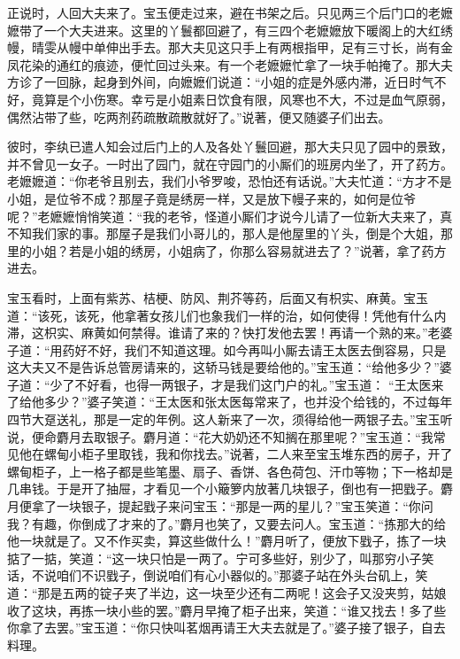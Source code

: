 \begin{parag}
    正说时，人回大夫来了。宝玉便走过来，避在书架之后。只见两三个后门口的老嬷嬷带了一个大夫进来。这里的丫鬟都回避了，有三四个老嬷嬷放下暖阁上的大红绣幔，晴雯从幔中单伸出手去。那大夫见这只手上有两根指甲，足有三寸长，尚有金凤花染的通红的痕迹，便忙回过头来。有一个老嬷嬷忙拿了一块手帕掩了。那大夫方诊了一回脉，起身到外间，向嬷嬷们说道：“小姐的症是外感内滞，近日时气不好，竟算是个小伤寒。幸亏是小姐素日饮食有限，风寒也不大，不过是血气原弱，偶然沾带了些，吃两剂药疏散疏散就好了。”说著，便又随婆子们出去。
\end{parag}


\begin{parag}
    彼时，李纨已遣人知会过后门上的人及各处丫鬟回避，那大夫只见了园中的景致，并不曾见一女子。一时出了园门，就在守园门的小厮们的班房内坐了，开了药方。老嬷嬷道：“你老爷且别去，我们小爷罗唆，恐怕还有话说。”大夫忙道：“方才不是小姐，是位爷不成？那屋子竟是绣房一样，又是放下幔子来的，如何是位爷呢？”老嬷嬷悄悄笑道：“我的老爷，怪道小厮们才说今儿请了一位新大夫来了，真不知我们家的事。那屋子是我们小哥儿的，那人是他屋里的丫头，倒是个大姐，那里的小姐？若是小姐的绣房，小姐病了，你那么容易就进去了？”说著，拿了药方进去。
\end{parag}


\begin{parag}
    宝玉看时，上面有紫苏、桔梗、防风、荆芥等药，后面又有枳实、麻黄。宝玉道：“该死，该死，他拿著女孩儿们也象我们一样的治，如何使得！凭他有什么内滞，这枳实、麻黄如何禁得。谁请了来的？快打发他去罢！再请一个熟的来。”老婆子道：“用药好不好，我们不知道这理。如今再叫小厮去请王太医去倒容易，只是这大夫又不是告诉总管房请来的，这轿马钱是要给他的。”宝玉道：“给他多少？”婆子道：“少了不好看，也得一两银子，才是我们这门户的礼。”宝玉道： “王太医来了给他多少？”婆子笑道：“王太医和张太医每常来了，也并没个给钱的，不过每年四节大趸送礼，那是一定的年例。这人新来了一次，须得给他一两银子去。”宝玉听说，便命麝月去取银子。麝月道：“花大奶奶还不知搁在那里呢？”宝玉道：“我常见他在螺甸小柜子里取钱，我和你找去。”说著，二人来至宝玉堆东西的房子，开了螺甸柜子，上一格子都是些笔墨、扇子、香饼、各色荷包、汗巾等物；下一格却是几串钱。于是开了抽屉，才看见一个小簸箩内放著几块银子，倒也有一把戥子。麝月便拿了一块银子，提起戥子来问宝玉：“那是一两的星儿？”宝玉笑道：“你问我？有趣，你倒成了才来的了。”麝月也笑了，又要去问人。宝玉道：“拣那大的给他一块就是了。又不作买卖，算这些做什么！”麝月听了，便放下戥子，拣了一块掂了一掂，笑道：“这一块只怕是一两了。宁可多些好，别少了，叫那穷小子笑话，不说咱们不识戥子，倒说咱们有心小器似的。”那婆子站在外头台矶上，笑道：“那是五两的锭子夹了半边，这一块至少还有二两呢！这会子又没夹剪，姑娘收了这块，再拣一块小些的罢。”麝月早掩了柜子出来，笑道：“谁又找去！多了些你拿了去罢。”宝玉道：“你只快叫茗烟再请王大夫去就是了。”婆子接了银子，自去料理。
\end{parag}


